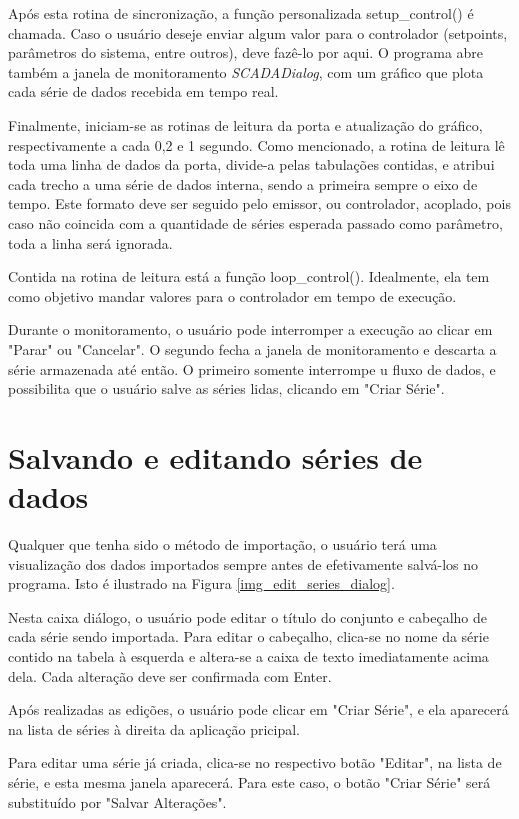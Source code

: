 Após esta rotina de sincronização, a função personalizada setup\_control() é chamada. Caso o usuário deseje enviar algum valor para o controlador (setpoints, parâmetros do sistema, entre  outros), deve fazê-lo por aqui. O programa abre também a janela de monitoramento \emph{SCADADialog}, com um gráfico que plota cada série de dados recebida em tempo real.

Finalmente, iniciam-se as rotinas de leitura da porta e atualização do gráfico, respectivamente a cada 0,2 e 1 segundo. Como mencionado, a rotina de leitura lê toda uma linha de dados da porta, divide-a pelas tabulações contidas, e atribui cada trecho a uma série de dados interna, sendo a primeira sempre o eixo de tempo. Este formato deve ser seguido pelo emissor, ou controlador, acoplado, pois caso não coincida com a quantidade de séries esperada passado como parâmetro, toda a linha será ignorada.

Contida na rotina de leitura está a função loop\_control(). Idealmente, ela tem como objetivo mandar valores para o controlador em tempo de execução.

Durante o monitoramento, o usuário pode interromper a execução ao clicar em "Parar" ou "Cancelar". O segundo fecha a janela de monitoramento e descarta a série armazenada até então. O primeiro somente interrompe u fluxo de dados, e possibilita que o usuário salve as séries lidas, clicando em "Criar Série".

\section{Salvando e editando séries de dados}

Qualquer que tenha sido o método de importação, o usuário terá uma visualização dos dados importados sempre antes de efetivamente salvá-los no programa. Isto é ilustrado na Figura \ref{img_edit_series_dialog}. 

Nesta caixa diálogo, o usuário pode editar o título do conjunto e cabeçalho de cada série sendo importada. Para editar o cabeçalho, clica-se no nome da série contido na tabela à esquerda e altera-se a caixa de texto imediatamente acima dela. Cada alteração deve ser confirmada com Enter.

Após realizadas as edições, o usuário pode clicar em "Criar Série", e ela aparecerá na lista de séries à direita da aplicação pricipal.

Para editar uma série já criada, clica-se no respectivo botão "Editar", na lista de série, e esta mesma janela aparecerá. Para este caso, o botão "Criar Série" será substituído por "Salvar Alterações".

